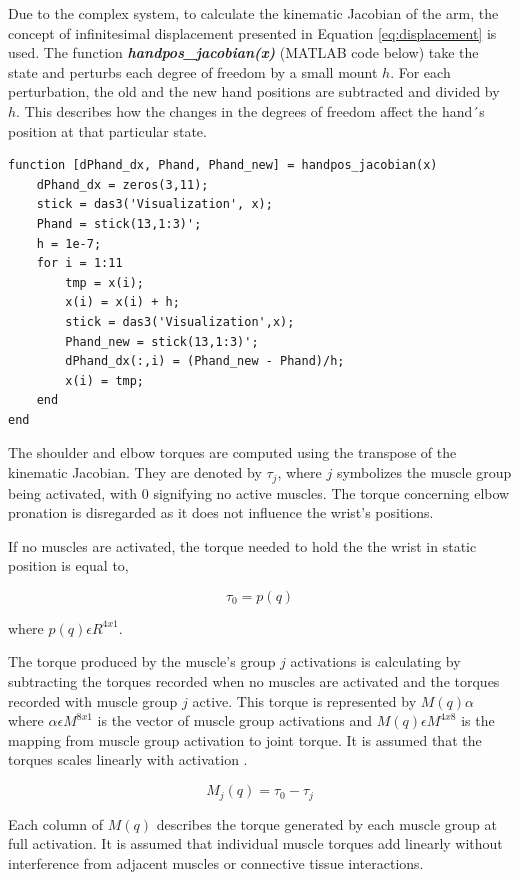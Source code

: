 Due to the complex system, to calculate the kinematic Jacobian of the arm, the concept of infinitesimal displacement presented in Equation \ref{eq:displacement} is used. The function \textbf{\textit{handpos\_jacobian(x)}} (MATLAB code below) take the state and perturbs each degree of freedom by a small mount $h$. For each perturbation, the old and the new hand positions are  subtracted and divided by $h$. This describes how the changes in the degrees of freedom affect the hand´s position at that particular state. 

\begin{lstlisting}[style=Matlab-editor]
function [dPhand_dx, Phand, Phand_new] = handpos_jacobian(x)
    dPhand_dx = zeros(3,11);
    stick = das3('Visualization', x);
    Phand = stick(13,1:3)';
    h = 1e-7;
    for i = 1:11
        tmp = x(i);
        x(i) = x(i) + h;
        stick = das3('Visualization',x);
        Phand_new = stick(13,1:3)';
        dPhand_dx(:,i) = (Phand_new - Phand)/h;
        x(i) = tmp;
    end        
end
\end{lstlisting}

The shoulder and elbow torques are computed using the transpose of the kinematic Jacobian. They are denoted by $\tau_{j}$, where $j$ symbolizes the muscle group being activated, with 0 signifying no active muscles. The torque concerning elbow pronation is disregarded as it does not influence the wrist's positions. 

If no muscles are activated, the torque needed to hold the the wrist in static position is equal to,

\begin{equation}
\tau_0 = p(q)
\end{equation}

where $p(q) \epsilon  R^{4x1}$. 

The torque produced by the muscle's group $j$ activations is calculating by subtracting the torques recorded when no muscles are activated and the torques recorded with muscle group $j$ active. This torque  is represented by $M(q)\alpha$ where $\alpha \epsilon M^{8x1}$ is the vector of muscle group activations and $M(q) \epsilon M^{4x8}$ is the mapping from muscle group activation to joint torque. It is assumed that the torques scales linearly with activation \cite{SPI}. 

\begin{equation} \label{eq:MAP}
    M_j(q) = \tau_0 - \tau_j
\end{equation}

Each column of $M(q)$ describes the torque generated by each muscle group at full activation. It is assumed that individual muscle torques add linearly without interference from adjacent muscles or connective tissue interactions. 




